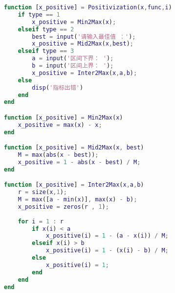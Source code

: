 \documentclass{article}
\begin{document}
\begin{lstlisting}[language=Matlab]
    function [x_positive] = Positivization(x,func,i)
    if type == 1  
        x_positive = Min2Max(x);  
    elseif type == 2  
        best = input('请输入最佳值 ：');
        x_positive = Mid2Max(x,best);
    elseif type == 3  
        a = input('区间下界： ');
        b = input('区间上界： '); 
        x_positive = Inter2Max(x,a,b);
    else
        disp('指标出错')
    end
end

function [x_positive] = Min2Max(x)
    x_positive = max(x) - x; 
end

function [x_positive] = Mid2Max(x, best)
    M = max(abs(x - best)); 
    x_positive = 1 - abs(x - best) / M; 
end

function [x_positive] = Inter2Max(x,a,b)
    r = size(x,1); 
    M = max([a - min(x)], max(x) - b); 
    x_positive = zeros(r , 1);  
    
    for i = 1 : r 
        if x(i) < a 
            x_positive(i) = 1 - (a - x(i)) / M;
        elseif x(i) > b 
            x_positive(i) = 1 - (x(i) - b) / M;
        else 
            x_positive(i) = 1;
        end
    end
end


\end{lstlisting} 
\end{document}
